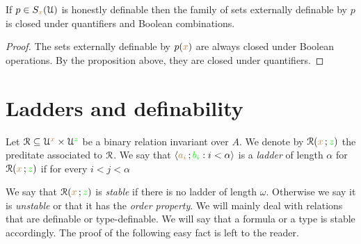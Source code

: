 \begin{corollary}
If $p\in S_{{\color{brown} x}}(\EuScript U)$ is honestly definable then the family of sets externally definable by $p$ is closed under quantifiers and Boolean combinations. 
\end{corollary}

\begin{proof}
The sets externally definable by $p({\color{brown} x})$ are always closed under Boolean operations. By the proposition above, they are closed under quantifiers. 
\end{proof}


\section{Ladders and definability}



Let $\EuScript R\subseteq\EuScript U^{\color{brown} x}\times\EuScript U^{\color{green} z}$ be a binary relation invariant over $A$.
We denote by $\EuScript R({\color{brown} x}\,;{\color{green} z})$ the preditate associated to $\EuScript R$.
We say that $\langle{\color{brown}a_i}\,;{\color{green} b_i} : i<\alpha\rangle$ is a \emph{ladder\/} of length $\alpha$ for $\EuScript R({\color{brown} x}\,;{\color{green} z})$ if for every $i<j<\alpha$



We say that $\EuScript R({\color{brown} x}\,;{\color{green} z})$ is \emph{stable\/} if there is no ladder of length $\omega$. Otherwise we say it is \emph{unstable} or that it has the \emph{order property}.
We will mainly deal with relations that are definable or type-definable.
We will say that a formula or a type is stable accordingly.
The proof of the following easy fact is left to the reader.

